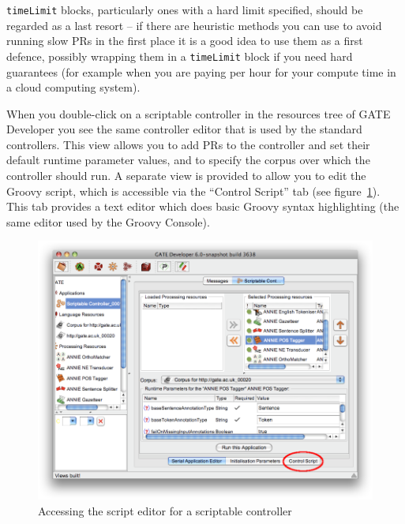 {\tt timeLimit} blocks, particularly ones with a hard limit specified, should
be regarded as a last resort -- if there are heuristic methods you can use to
avoid running slow PRs in the first place it is a good idea to use them as a
first defence, possibly wrapping them in a {\tt timeLimit} block if you need
hard guarantees (for example when you are paying per hour for your compute time
in a cloud computing system).


When you double-click on a scriptable controller in the resources tree of GATE
Developer you see the same controller editor that is used by the standard
controllers.  This view allows you to add PRs to the controller and set their
default runtime parameter values, and to specify the corpus over which the
controller should run.  A separate view is provided to allow you to edit the
Groovy script, which is accessible via the ``Control Script'' tab (see
figure~\ref{fig:api:groovy:controller}).  This tab provides a text editor which
does basic Groovy syntax highlighting (the same editor used by the Groovy
Console).
\begin{figure}[tbp]
\begin{center}
\includegraphics[scale=0.5]{groovy-scriptable-controller.png}
\caption{Accessing the script editor for a scriptable controller}
\label{fig:api:groovy:controller}
\end{center}
\end{figure}


